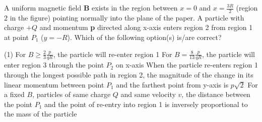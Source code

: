 

    \item A uniform magnetic field \textbf{B} exists in the region between \(x = 0\) and \(x = \frac{3R}{2}\) (region 2 in the figure) pointing normally into the plane of the paper. A particle with charge \(+Q\) and momentum \textbf{p} directed along x-axis enters region 2 from region 1 at point \(P_1\) (\(y = -R\)). Which of the following option(s) is/are correct?
        \begin{tasks}(1)
            \task For \(B \geq \frac{2}{3} \frac{p}{qR}\), the particle will re-enter region 1
            \task For \(B = \frac{8}{13} \frac{p}{qR}\), the particle will enter region 3 through the point \(P_2\) on x-axis
            \task When the particle re-enters region 1 through the longest possible path in region 2, the magnitude of the change in its linear momentum between point \(P_1\) and the farthest point from y-axis is \(p\sqrt{2}\)
            \task For a fixed \(B\), particles of same charge \(Q\) and same velocity \(v\), the distance between the point \(P_1\) and the point of re-entry into region 1 is inversely proportional to the mass of the particle
        \end{tasks}

\begin{center}
\end{center}
